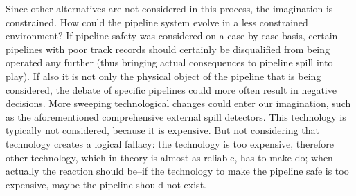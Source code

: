 \documentclass[12pt, man, natbib]{apa6}
\begin{document}
	Since other alternatives are not considered in this process, the imagination is constrained. How could the pipeline system evolve in a less constrained environment? If pipeline safety was considered on a case-by-case basis, certain pipelines with poor track records should certainly be disqualified from being operated any further (thus bringing actual consequences to pipeline spill into play). If also it is not only the physical object of the pipeline that is being considered, the debate of specific pipelines could more often result in negative decisions. More sweeping technological changes could enter our imagination, such as the aforementioned comprehensive external spill detectors. This technology is typically not considered, because it is expensive. But not considering that technology creates a logical fallacy: the technology is too expensive, therefore other technology, which in theory is almost as reliable, has to make do; when actually the reaction should be--if the technology to make the pipeline safe is too expensive, maybe the pipeline should not exist.
	

\end{document}
